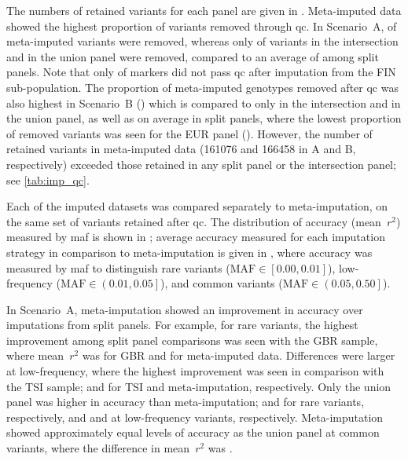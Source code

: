 %

%

The numbers of retained variants for each panel are given in .
Meta-imputed data showed the highest proportion of variants removed through \gls{qc}.
In Scenario~A,  of meta-imputed variants were removed, whereas only  of variants in the intersection and  in the union panel were removed, compared to an average of  among split panels.
Note that only  of markers did not pass \gls{qc} after imputation from the FIN sub-population.
The proportion of meta-imputed genotypes removed after \gls{qc} was also highest in Scenario~B () which is compared to only  in the intersection and  in the union panel, as well as  on average in split panels, where the lowest proportion of removed variants was seen for the EUR panel ().
However, the number of retained variants in meta-imputed data (\num{161076} and \num{166458} in A and B, respectively) exceeded those retained in any split panel or the intersection panel; see \cref{tab:imp_qc}.

%

%

Each of the imputed datasets was compared separately to meta-imputation, on the same set of variants retained after \gls{qc}.
The distribution of accuracy (mean~$r^2$) measured by \gls{maf} is shown in ; average accuracy measured for each imputation strategy in comparison to meta-imputation is given in , where accuracy was measured by \gls{maf} to distinguish
rare variants (${\text{MAF} \in \left[ 0.00, 0.01\right]}$),
low-frequency (${\text{MAF} \in \left( 0.01, 0.05\right]}$), and
common variants (${\text{MAF} \in \left( 0.05, 0.50\right]}$).

In Scenario~A, meta-imputation showed an improvement in accuracy over imputations from split panels.
For example, for rare variants, the highest improvement among split panel comparisons was seen with the GBR sample, where mean~$r^2$ was  for GBR and  for meta-imputed data.
Differences were larger at low-frequency, where the highest improvement was seen in comparison with the TSI sample;
 and 
for TSI and meta-imputation, respectively.
Only the union panel was higher in accuracy than meta-imputation; \eg
{} and 
for rare variants, respectively, and
 and 
at low-frequency variants, respectively.
Meta-imputation showed approximately equal levels of accuracy as the union panel at common variants, where the difference in mean~$r^2$ was .

